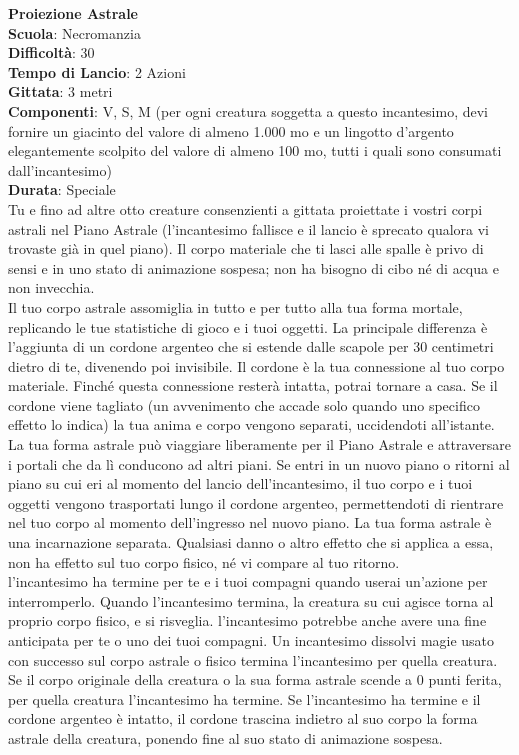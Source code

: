 \begin{multicols}{2}
\medskip\textbf{Proiezione Astrale}\\
\textbf{Scuola}: Necromanzia\\
\textbf{Difficoltà}:  30\\
\textbf{Tempo di Lancio}: 2 Azioni\\
\textbf{Gittata}: 3 metri\\
\textbf{Componenti}: V, S, M (per ogni creatura soggetta a questo incantesimo, devi fornire un giacinto del valore di almeno 1.000 mo e un lingotto d’argento elegantemente scolpito del valore di almeno 100 mo, tutti i quali sono consumati dall'incantesimo)\\
\textbf{Durata}: Speciale\\
Tu e fino ad altre otto creature consenzienti a gittata proiettate i vostri corpi astrali nel Piano Astrale (l'incantesimo fallisce e il lancio è sprecato qualora vi trovaste già in quel piano). Il corpo materiale che ti lasci alle spalle è privo di sensi e in uno stato di animazione sospesa; non ha bisogno di cibo né di acqua e non invecchia.\\
Il tuo corpo astrale assomiglia in tutto e per tutto alla tua forma mortale, replicando le tue statistiche di gioco e i tuoi oggetti. La principale differenza è l’aggiunta di un cordone argenteo che si estende dalle scapole per 30 centimetri dietro di te, divenendo poi invisibile. Il cordone è la tua connessione al tuo corpo materiale. Finché questa connessione resterà intatta, potrai tornare a casa. Se il cordone viene tagliato (un avvenimento che accade solo quando uno specifico effetto lo indica) la tua anima e corpo vengono separati, uccidendoti all'istante.\\
La tua forma astrale può viaggiare liberamente per il Piano Astrale e attraversare i portali che da lì conducono ad altri piani. Se entri in un nuovo piano o ritorni al piano su cui eri al momento del lancio dell'incantesimo, il tuo corpo e i tuoi oggetti vengono trasportati lungo il cordone argenteo, permettendoti di rientrare nel tuo corpo al momento dell'ingresso nel nuovo piano. La tua forma astrale è una incarnazione separata. Qualsiasi danno o altro effetto che si applica a essa, non ha effetto sul tuo corpo fisico, né vi compare al tuo ritorno.\\
l'incantesimo ha termine per te e i tuoi compagni quando userai un'azione per interromperlo. Quando l'incantesimo termina, la creatura su cui agisce torna al proprio corpo fisico, e si risveglia. l'incantesimo potrebbe anche avere una fine anticipata per te o uno dei tuoi compagni. Un incantesimo dissolvi magie usato con successo sul corpo astrale o fisico termina l'incantesimo per quella creatura. Se il corpo originale della creatura o la sua forma astrale scende a 0 punti ferita, per quella creatura l'incantesimo ha termine. Se l'incantesimo ha termine e il cordone argenteo è intatto, il cordone trascina indietro al suo corpo la forma astrale della creatura, ponendo fine al suo stato di animazione sospesa.\\

\end{multicols}

